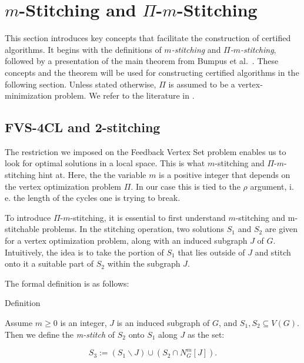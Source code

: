 \section{$m$-Stitching and $\Pi$-$m$-Stitching}
\label{section:m-stitching}

This section introduces key concepts that facilitate the construction of certified algorithms. 
It begins with the definitions of \textit{$m$-stitching} and \textit{$\Pi$-$m$-stitching}, 
followed by a presentation of the main theorem from 
Bumpus et al.~\cite{bumpus_et_al:LIPIcs.SWAT.2024.19}. 
These concepts and the theorem will be used for constructing certified algorithms 
in the following section. 
Unless stated otherwise, $\Pi$ is assumed to be a vertex-minimization problem.
We refer to the literature in \cite{bumpus_et_al:LIPIcs.SWAT.2024.19}.

\subsection{FVS-4CL and 2-stitching}

The restriction we imposed on the Feedback Vertex Set problem enables us to look 
for optimal solutions in a local space. This is what $m$-stitching and $\Pi$-$m$-stitching
hint at. Here, the the variable $m$ is a positive integer that depends on the vertex optimization 
problem $\Pi$. In our case this is tied to the $\rho$ argument, i. e. the length of 
the cycles one is trying to break. 

To introduce $\Pi$-$m$-stitching, it is essential to first understand $m$-stitching 
and m-stitchable problems. In the stitching operation, two solutions $S_1$ and $S_2$ 
are given for a vertex optimization problem, along with an induced subgraph $J$ of $G$. 
Intuitively, the idea is to take the portion of $S_1$ that lies outside of $J$ 
and stitch onto it a suitable part of $S_2$ within the subgraph $J$.

The formal definition is as follows:

\begin{mydefinition}[$m$-stitching]{Definition}
    \label{m-stitch}

    Assume $m \geq 0$ is an integer, $J$ is an induced subgraph of $G$, and 
    $S_1, S_2 \subseteq V(G)$. Then we define the \textit{m-stitch} of $S_2$ onto $S_1$ along 
    $J$ as the set:

    \[S_3 := (S_1 \backslash J) \cup (S_2 \cap N^{m}_{G} \left[J\right]).\]

\end{mydefinition}

